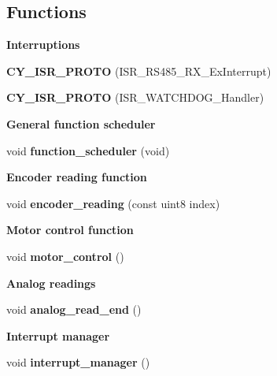 \subsection*{Functions}
\begin{Indent}\textbf{ Interruptions}\par
\begin{DoxyCompactItemize}
\item 
\textbf{ C\+Y\+\_\+\+I\+S\+R\+\_\+\+P\+R\+O\+TO} (I\+S\+R\+\_\+\+R\+S485\+\_\+\+R\+X\+\_\+\+Ex\+Interrupt)
\item 
\textbf{ C\+Y\+\_\+\+I\+S\+R\+\_\+\+P\+R\+O\+TO} (I\+S\+R\+\_\+\+W\+A\+T\+C\+H\+D\+O\+G\+\_\+\+Handler)
\end{DoxyCompactItemize}
\end{Indent}
\begin{Indent}\textbf{ General function scheduler}\par
\begin{DoxyCompactItemize}
\item 
void \textbf{ function\+\_\+scheduler} (void)
\end{DoxyCompactItemize}
\end{Indent}
\begin{Indent}\textbf{ Encoder reading function}\par
\begin{DoxyCompactItemize}
\item 
void \textbf{ encoder\+\_\+reading} (const uint8 index)
\end{DoxyCompactItemize}
\end{Indent}
\begin{Indent}\textbf{ Motor control function}\par
\begin{DoxyCompactItemize}
\item 
void \textbf{ motor\+\_\+control} ()
\end{DoxyCompactItemize}
\end{Indent}
\begin{Indent}\textbf{ Analog readings}\par
\begin{DoxyCompactItemize}
\item 
void \textbf{ analog\+\_\+read\+\_\+end} ()
\end{DoxyCompactItemize}
\end{Indent}
\begin{Indent}\textbf{ Interrupt manager}\par
\begin{DoxyCompactItemize}
\item 
void \textbf{ interrupt\+\_\+manager} ()
\end{DoxyCompactItemize}
\end{Indent}

